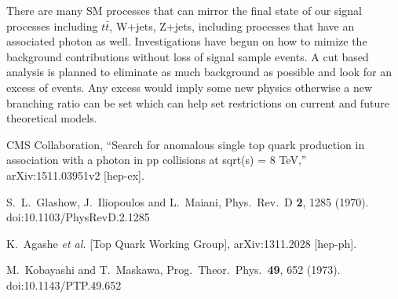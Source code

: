 \documentclass[12pt,letterpaper]{article}
\begin{document}
\par There are many SM processes that can mirror the final state of our signal processes including $t\bar{t}$, W+jets, Z+jets, including processes that have an associated photon as well.  Investigations have begun on how to mimize the background contributions without loss of signal sample events.  A cut based analysis is planned to eliminate as much background as possible and look for an excess of events.  Any excess would imply some new physics otherwise a new branching ratio can be set which can help set restrictions on current and future theoretical models.


\begin{thebibliography}{9}

  CMS Collaboration,
  ``Search for anomalous single top quark production in association with a photon in pp collisions at sqrt(s) = 8 TeV,''
  arXiv:1511.03951v2 [hep-ex].

  S.~L.~Glashow, J.~Iliopoulos and L.~Maiani,
  Phys.\ Rev.\ D {\bf 2}, 1285 (1970).
  doi:10.1103/PhysRevD.2.1285

  K.~Agashe {\it et al.} [Top Quark Working Group],
  arXiv:1311.2028 [hep-ph].

  M.~Kobayashi and T.~Maskawa,
  Prog.\ Theor.\ Phys.\  {\bf 49}, 652 (1973).
  doi:10.1143/PTP.49.652
\end{thebibliography}
\end{document}
